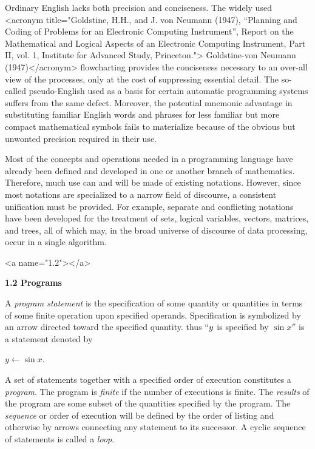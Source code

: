 \par Ordinary English lacks both precision and conciseness. The widely used 
<acronym title="Goldstine, H.H., and J. von Neumann (1947), “Planning and Coding of Problems for an Electronic Computing Instrument”, Report on the Mathematical and Logical Aspects of an Electronic Computing Instrument, Part II, vol. 1, Institute for Advanced Study, Princeton."> Goldstine-von Neumann (1947)</acronym> flowcharting provides the conciseness necessary to an over-all view of the processes, only at the cost of suppressing essential detail. The so-called pseudo-English used as a basis for certain automatic programming systems suffers from the same defect. Moreover, the potential mnemonic advantage in substituting familiar English words and phrases for less familiar but more compact mathematical symbols fails to materialize because of the obvious but unwonted precision required in their use.

\par Most of the concepts and operations needed in a programming language have already been defined and developed in one or another branch of mathematics. Therefore, much use can and will be made of existing notations. However, since most notations are specialized to a narrow field of discourse, a consistent unification must be provided. For example, separate and conflicting notations have been developed for the treatment of sets, logical variables, vectors, matrices, and trees, all of which may, in the broad universe of discourse of data processing, occur in a single algorithm.

<a name="1.2"></a>
\par \textbf{1.2 Programs}

\par A \textit{program statement} is the specification of some quantity or quantities in terms of some finite operation upon specified operands. Specification is symbolized by an arrow directed toward the specified quantity. thus $``y$ is specified by $\sin x''$ is a statement denoted by

\par $y ← \sin x$.

\par A set of statements together with a specified order of execution constitutes a \textit{program}. The program is \textit{finite} if the number of executions is finite. The \textit{results} of the program are some subset of the quantities specified by the program. The \textit{sequence} or order of execution will be defined by the order of listing and otherwise by arrows connecting any statement to its successor. A cyclic sequence of statements is called a \textit{loop}.


